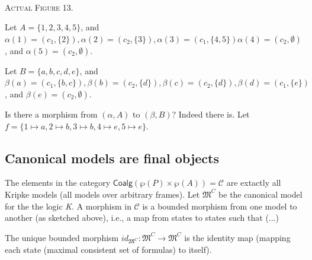 \begin{minipage}[b]{0.3\linewidth}
\begin{center}
\\
\textsc{Actual Figure 13. } 
\end{center}
\end{minipage}


Let $A = \{1, 2, 3, 4, 5\}$, and $\alpha(1) = (c_1, \{2\}), \alpha(2) = (c_2, \{3\}), \alpha(3) = (c_1, \{4, 5\}) \alpha(4) = (c_2, \emptyset)$, and $\alpha(5) = (c_2, \emptyset)$.

Let $B = \{a, b, c, d, e\}$, and $\beta(a) = (c_1, \{b, c\}), \beta(b) = (c_2, \{d\}), \beta(c) = (c_2, \{d\}), \beta(d) = (c_1, \{e\})$, and $\beta(e) = (c_2, \emptyset)$.

Is there a morphism from $(\alpha, A)$ to $(\beta, B)$? Indeed there is. Let $f = \{1 \mapsto a, 2 \mapsto b, 3 \mapsto b, 4 \mapsto e, 5 \mapsto e\}$.



\subsection{Canonical models are final objects}
The elements in the category $\mathsf{Coalg}(\wp(P)\times\wp(A)) = \mathcal C$ are extactly all Kripke models (all models over arbitrary frames). Let $\mathfrak M^C$ be the canonical model for the the logic \textit{K}. A morphism in $\mathcal C$ is a bounded morphism from one model to another (as sketched above), i.e., a map from states to states such that (...)

\begin{proposition}
The unique bounded morphism $id_{\mathfrak M^C} : \mathfrak M^C \to \mathfrak M^C$ is the identity map (mapping each state (maximal consistent set of formulas) to itself).\end{proposition}


